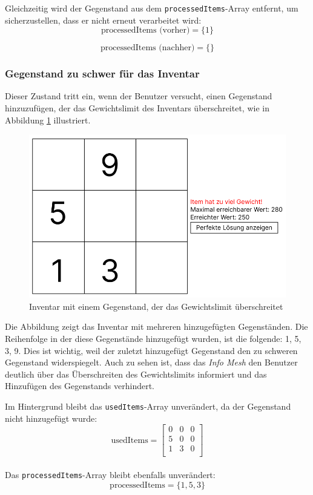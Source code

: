 Gleichzeitig wird der Gegenstand aus dem \texttt{processedItems}-Array entfernt, um sicherzustellen, dass er nicht
erneut verarbeitet wird:
\[
\text{processedItems (vorher)} = \{1\}
\]

\[
\text{processedItems (nachher)} = \{\}
\]

\subsubsection*{Gegenstand zu schwer für das Inventar}
Dieser Zustand tritt ein, wenn der Benutzer versucht, einen Gegenstand hinzuzufügen, der das Gewichtslimit des Inventars
überschreitet, wie in Abbildung \ref{fig:controller_itemTooHeavy} illustriert.


\begin{figure}[H]
\centering
\includegraphics[scale=0.5]{images/itemToHeavy}
\caption{Inventar mit einem Gegenstand, der das Gewichtslimit überschreitet}
\label{fig:controller_itemTooHeavy}
\end{figure}

Die Abbildung zeigt das Inventar mit mehreren hinzugefügten Gegenständen. Die Reihenfolge in der diese Gegenstände
hinzugefügt wurden, ist die folgende: 1, 5, 3, 9. Dies ist wichtig, weil der zuletzt hinzugefügt Gegenstand den zu
schweren Gegenstand widerspiegelt. Auch zu sehen ist, dass das \textit{Info Mesh} den Benutzer deutlich über das
Überschreiten des Gewichtslimits informiert und das Hinzufügen des Gegenstands verhindert.

Im Hintergrund bleibt das \texttt{usedItems}-Array unverändert, da der Gegenstand nicht hinzugefügt wurde:
\[
\text{usedItems} =
\left[
\begin{array}{ccccc}
0 & 0 & 0 \\
5 & 0 & 0 \\
1 & 3 & 0 \\
\end{array}
\right]
\]
\\
Das \texttt{processedItems}-Array bleibt ebenfalls unverändert:
\[
\text{processedItems} = \{1, 5, 3\}
\]

